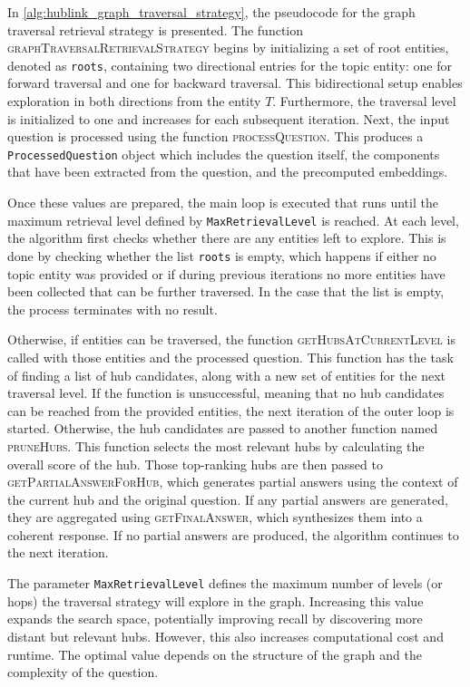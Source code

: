 In \autoref{alg:hublink_graph_traversal_strategy}, the pseudocode for the graph traversal retrieval strategy is presented. The function \textsc{graphTraversalRetrievalStrategy} begins by initializing a set of root entities, denoted as \texttt{roots}, containing two directional entries for the topic entity: one for forward traversal and one for backward traversal. This bidirectional setup enables exploration in both directions from the entity \(T\). Furthermore, the traversal level is initialized to one and increases for each subsequent iteration. Next, the input question is processed using the function \textsc{processQuestion}. This produces a \texttt{ProcessedQuestion} object which includes the question itself, the components that have been extracted from the question, and the precomputed embeddings.

Once these values are prepared, the main loop is executed that runs until the maximum retrieval level defined by \texttt{MaxRetrievalLevel} is reached. At each level, the algorithm first checks whether there are any entities left to explore. This is done by checking whether the list \texttt{roots} is empty, which happens if either no topic entity was provided or if during previous iterations no more entities have been collected that can be further traversed. In the case that the list is empty, the process terminates with no result.

Otherwise, if entities can be traversed, the function \textsc{getHubsAtCurrentLevel} is called with those entities and the processed question. This function has the task of finding a list of hub candidates, along with a new set of entities for the next traversal level. If the function is unsuccessful, meaning that no hub candidates can be reached from the provided entities, the next iteration of the outer loop is started. Otherwise, the hub candidates are passed to another function named \textsc{pruneHubs}. This function selects the most relevant hubs by calculating the overall score of the hub. Those top-ranking hubs are then passed to \textsc{getPartialAnswerForHub}, which generates partial answers using the context of the current hub and the original question. If any partial answers are generated, they are aggregated using \textsc{getFinalAnswer}, which synthesizes them into a coherent response. If no partial answers are produced, the algorithm continues to the next iteration.

\begin{tcolorbox}[title=Parameter: \texttt{MaxRetrievalLevel}]
    The parameter \texttt{MaxRetrievalLevel} defines the maximum number of levels (or hops) the traversal strategy will explore in the graph. Increasing this value expands the search space, potentially improving recall by discovering more distant but relevant hubs. However, this also increases computational cost and runtime. The optimal value depends on the structure of the graph and the complexity of the question.
\end{tcolorbox}

